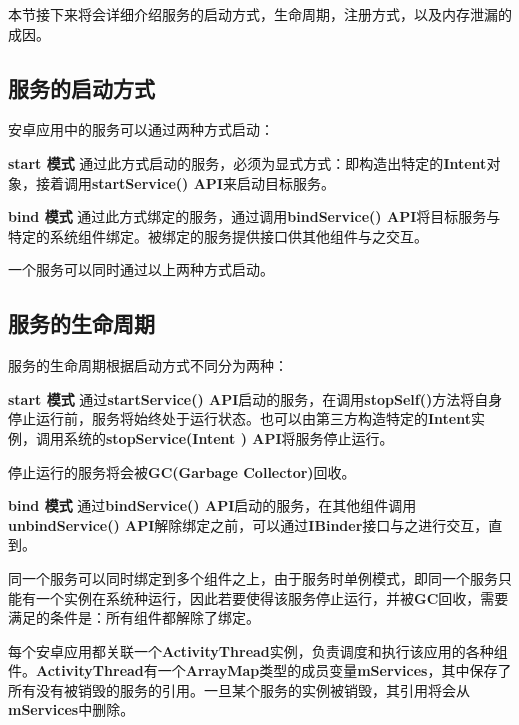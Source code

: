 本节接下来将会详细介绍服务的启动方式，生命周期，注册方式，以及内存泄漏的成因。

\subsection{服务的启动方式}
安卓应用中的服务可以通过两种方式启动\cite{service}：

\textbf{start 模式 } 通过此方式启动的服务，必须为显式方式：即构造出特定的\textbf{Intent}对象，接着调用\textbf{startService() API}来启动目标服务。

\textbf{bind 模式 } 通过此方式绑定的服务，通过调用\textbf{bindService() API}将目标服务与特定的系统组件绑定。被绑定的服务提供接口供其他组件与之交互。

一个服务可以同时通过以上两种方式启动。

\subsection{服务的生命周期}
服务的生命周期根据启动方式不同分为两种\cite{service}：

\textbf{start 模式 } 通过\textbf{startService() API}启动的服务，在调用\textbf{stopSelf()}方法将自身停止运行前，服务将始终处于运行状态。也可以由第三方构造特定的\textbf{Intent}实例，调用系统的\textbf{stopService(Intent ) API}将服务停止运行。

停止运行的服务将会被\textbf{GC(Garbage Collector)}回收。

\textbf{bind 模式 } 通过\textbf{bindService() API}启动的服务，在其他组件调用\textbf{unbindService() API}解除绑定之前，可以通过\textbf{IBinder}接口与之进行交互，直到。

同一个服务可以同时绑定到多个组件之上，由于服务时单例模式，即同一个服务只能有一个实例在系统种运行，因此若要使得该服务停止运行，并被\textbf{GC}回收，需要满足的条件是：所有组件都解除了绑定。

每个安卓应用都关联一个\textbf{ActivityThread}实例，负责调度和执行该应用的各种组件。\textbf{ActivityThread}有一个\textbf{ArrayMap}类型的成员变量\textbf{mServices}，其中保存了所有没有被销毁的服务的引用。一旦某个服务的实例被销毁，其引用将会从\textbf{mServices}中删除。

